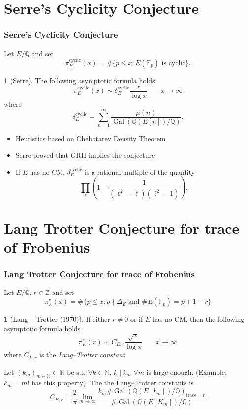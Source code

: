 \documentclass[10pt,final]{beamer} %
\newcommand{\Q}{\mathbb Q}
\newcommand{\Z}{\mathbb Z}
\newcommand{\N}{\mathbb N}
\newcommand{\F}{\mathbb F}
\theoremstyle{definition}
\newtheorem{conj}[theorem]{\translate{Conjecture}}
\begin{document}
\section{Serre's Cyclicity Conjecture}

\begin{frame}
\frametitle{Serre's Cyclicity Conjecture}
 Let $E/\Q$ and set\pause
$$\pi_E^{\text{cyclic}}(x)=\#\{p\le x:\overline E(\F_p)\text{ is cyclic}\}.$$\pause

\begin{conj}[Serre]
The following asymptotic formula holds
$$\pi_E^{\text{cyclic}}(x)\sim\delta_E^{\text{cyclic}}\frac x{\log x}\qquad x\rightarrow\infty$$
where 
$$\delta_E^{\text{cyclic}}=\sum_{n=1}^\infty\frac{\mu(n)}{\operatorname{Gal}(\Q(E[n])/\Q)}.$$
 \end{conj}\pause

\begin{itemize}[<+-| alert@+>]
 \item Heuristics based on Chebotarev Density Theorem 
 \item Serre proved that GRH implies the conjecture
 \item If $E$ has no CM,  $\delta_E^{\text{cyclic}}$ is a rational multiple of the quantity
$$\prod_\ell\left(1-\frac{1}{(\ell^2-\ell)(\ell^2-1)}\right).$$
\end{itemize}

\end{frame}


\section{Lang Trotter Conjecture for trace of Frobenius}

\begin{frame}
\frametitle{Lang Trotter Conjecture for trace of Frobenius} 
 Let $E/\Q$, $r\in\Z$  and set\pause
$$\pi_E^r(x)=\#\{p\le x: p\nmid\Delta_E\text{ and } \#\overline E(\F_p)=p+1-r\}$$
\pause
\begin{conj}[Lang -- Trotter (1970)]
If either $r\ne0$ or if $E$ has no CM, then
the following asymptotic formula holds
$$\pi_E^r(x)\sim C_{E,r}\frac{\sqrt{x}}{\log x}\qquad x\rightarrow\infty$$
where $C_{E,r}$ is the  \emph{Lang--Trotter constant}
 \end{conj}\pause

\begin{definition}
Let $(k_m)_{m\in\N}\subset\N$ be s.t. $\forall k\in\N$, $k\mid k_m$  $\forall m$ is large enough. 
(Example: $k_m=m!$  has this property). The the Lang--Trotter constants is\pause
$$C_{E,r}=\frac2\pi\lim_{m\rightarrow\infty}\frac{k_m\#\operatorname{Gal}(\Q(E[k_m])/\Q)_{\text{trace}=r}}{\#\operatorname{Gal}(\Q(E[K_m])/\Q)}$$
\end{definition}

 \end{frame}
\end{document}
